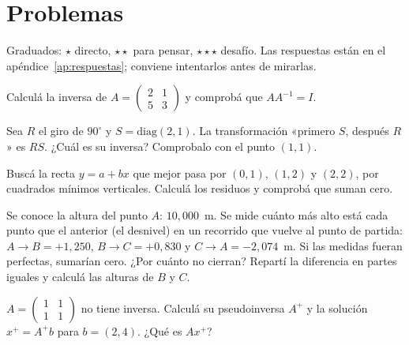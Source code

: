 \section{Problemas}\label{sec:problemas-11}

Graduados: \({\star}\) directo, \({\star}{\star}\) para pensar, \({\star}{\star}{\star}\) desafío. Las respuestas están en el apéndice~\ref{ap:respuestas}; conviene intentarlos antes de mirarlas.

\begin{problema}[\({\star}\)]\label{pb:11-1}
Calculá la inversa de \(A=\begin{pmatrix}2&1\\5&3\end{pmatrix}\) y comprobá que \(AA^{-1}=I\).
\end{problema}

\begin{problema}[\({\star}{\star}\)]\label{pb:11-2}
Sea \(R\) el giro de \(90^\circ\) y \(S=\mathrm{diag}(2,1)\). La transformación «primero \(S\), después \(R\)» es \(RS\). ¿Cuál es su inversa? Comprobalo con el punto \((1,1)\).
\end{problema}

\begin{problema}[\({\star}{\star}\)]\label{pb:11-3}
Buscá la recta \(y=a+bx\) que mejor pasa por \((0,1)\), \((1,2)\) y \((2,2)\), por cuadrados mínimos verticales. Calculá los residuos y comprobá que suman cero.
\end{problema}

\begin{problema}[\({\star}{\star}\)]\label{pb:11-4}
Se conoce la altura del punto \(A\): \(10{,}000\)~m. Se mide cuánto más alto está cada punto que el anterior (el desnivel) en un recorrido que vuelve al punto de partida: \(A\to B=+1{,}250\), \(B\to C=+0{,}830\) y \(C\to A=-2{,}074\)~m. Si las medidas fueran perfectas, sumarían cero. ¿Por cuánto no cierran? Repartí la diferencia en partes iguales y calculá las alturas de \(B\) y \(C\).
\end{problema}

\begin{problema}[\({\star}{\star}{\star}\)]\label{pb:11-5}
\(A=\begin{pmatrix}1&1\\1&1\end{pmatrix}\) no tiene inversa. Calculá su pseudoinversa \(A^+\) y la solución \(x^+=A^+b\) para \(b=(2,4)\). ¿Qué es \(Ax^+\)?
\end{problema}
